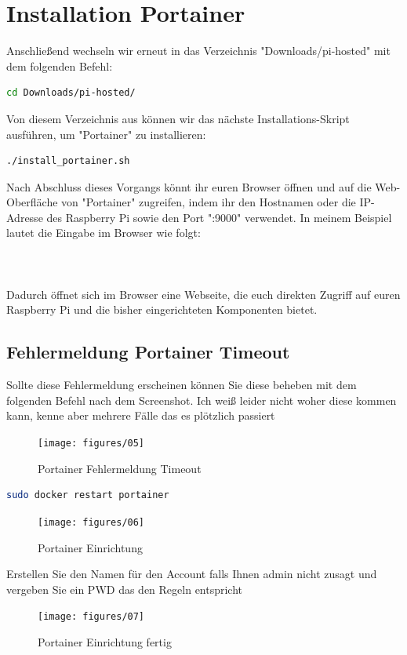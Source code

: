 \documentclass[a4paper]{article}
\begin{document}
\section{Installation Portainer}
Anschließend wechseln wir erneut in das Verzeichnis "Downloads/pi-hosted" mit dem folgenden Befehl:
\begin{lstlisting}[language=bash, caption={Verzeichnis pi hosted betreten}, breaklines=false]
	cd Downloads/pi-hosted/
\end{lstlisting}
Von diesem Verzeichnis aus können wir das nächste Installations-Skript ausführen, um "Portainer" zu installieren:
\begin{lstlisting}[language=bash, caption={Installation Portainer}, breaklines=false]
./install_portainer.sh
\end{lstlisting}
Nach Abschluss dieses Vorgangs könnt ihr euren Browser öffnen und auf die Web-Oberfläche von "Portainer" zugreifen, indem ihr den Hostnamen oder die IP-Adresse des Raspberry Pi sowie den Port ":9000" verwendet. In meinem Beispiel lautet die Eingabe im Browser wie folgt:\\
\\
\\\\
Dadurch öffnet sich im Browser eine Webseite, die euch direkten Zugriff auf euren Raspberry Pi und die bisher eingerichteten Komponenten bietet. 
\\
\subsection{Fehlermeldung Portainer Timeout}
Sollte diese Fehlermeldung erscheinen können Sie diese beheben mit dem folgenden Befehl nach dem Screenshot. Ich weiß leider nicht woher diese kommen kann, kenne aber mehrere Fälle das es plötzlich passiert
\begin{figure}[htbp]
	\centering
	\texttt{[image: figures/05]}
	\caption{Portainer Fehlermeldung Timeout}
	\label{fig:Portainer Fehlermeldung Timeout}
\end{figure}
\begin{lstlisting}[language=bash, caption={Portainer Reboot}, breaklines=false]
	sudo docker restart portainer
\end{lstlisting}
\begin{figure}[htbp]
	\centering
	\texttt{[image: figures/06]}
	\caption{Portainer Einrichtung }
	\label{fig:Portainer Einrichtung }
\end{figure}
Erstellen Sie den Namen für den Account falls Ihnen admin nicht zusagt und vergeben Sie ein PWD das den Regeln entspricht
\begin{figure}[htbp]
	\centering
	\texttt{[image: figures/07]}
	\caption{Portainer Einrichtung fertig }
	\label{fig:Portainer Einrichtung fertig}
\end{figure}
	\newpage
\end{document}
